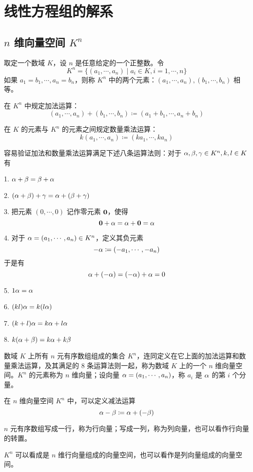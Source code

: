 \chapter{线性方程组的解系}

\section{\texorpdfstring{$n$ 维向量空间 $K^n$}{n 维向量空间 Kn}}

取定一个数域 $K$，设 $n$ 是任意给定的一个正整数。令
\[K^n=\{(a_1,\cdots,a_n) \mid a_i\in K,i=1,\cdots,n\}\]
如果 $a_1=b_1,\cdots,a_n=b_n$，则称 $K^n$ 中的两个元素：$(a_1,\cdots,a_n),(b_1,\cdots,b_n)$ 相等。

在 $K^n$ 中规定加法运算：
\[(a_1,\cdots,a_n)+(b_1,\cdots,b_n)\coloneqq (a_1+b_1,\cdots,a_n+b_n)\]

在 $K$ 的元素与 $K^n$ 的元素之间规定数量乘法运算：
\[k(a_1,\cdots,a_n) \coloneqq  (ka_1,\cdots,ka_n)\]

容易验证加法和数量乘法运算满足下述八条运算法则：对于 $\alpha,\beta,\gamma\in K^n,k,l\in K$ 有

1. $\alpha+\beta=\beta+\alpha$

2. $(\alpha+\beta)+\gamma=\alpha+(\beta+\gamma)$

3. 把元素 $(0,\cdots,0)$ 记作零元素 $\boldsymbol{0}$，使得
\[\boldsymbol{0} + \alpha = \alpha + \boldsymbol{0} = \alpha\]

4. 对于 $\alpha = (a_1,\cdots,a_n)\in K^n$，定义其负元素
\[-\alpha \coloneqq  (-a_1,\cdots,-a_n)\]
于是有
\[\alpha + (-\alpha) = (-\alpha)+\alpha = 0\]

5. $1\alpha = \alpha$

6. $(kl)\alpha = k(l\alpha)$

7. $(k+l)\alpha = k\alpha + l\alpha$

8. $k (\alpha+\beta) = k\alpha + k\beta$

\begin{definition}[$n$ 维向量空间]
	数域 $K$ 上所有 $n$ 元有序数组组成的集合 $K^n$，连同定义在它上面的加法运算和数量乘法运算，及其满足的 8 条运算法则一起，称为数域 $K$ 上的一个 $n$ 维向量空间。$K^n$ 的元素称为 $n$ 维向量；设向量 $\alpha  = (a_1,\cdots,a_n)$，称 $a_i$ 是 $\alpha$ 的第 $i$ 个分量。
\end{definition}

在 $n$ 维向量空间 $K^n$ 中，可以定义减法运算
\[\alpha - \beta \coloneqq  \alpha + (-\beta)\]

$n$ 元有序数组写成一行，称为行向量；写成一列，称为列向量，也可以看作行向量的转置。

$K^n$ 可以看成是 $n$ 维行向量组成的向量空间，也可以看作是列向量组成的向量空间。

